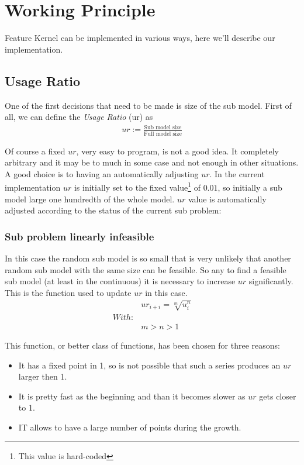 \section{Working Principle}

Feature Kernel can be implemented in various ways, here we'll describe our implementation. 

\subsection{Usage Ratio} \label{sec:usage-ratio}
One of the first decisions that need to be made is size of the sub model.
First of all, we can define the \emph{Usage Ratio} (ur) as 
\begin{align}
    ur := \frac{\text{Sub model size}}{\text{Full model size}} \label{eq:usage-ratio}
\end{align}

Of course a fixed $ur$, very easy to program, is not a good idea. 
It completely arbitrary and it may be to much in some case and not enough in other situations. 
A good choice is to having an automatically adjusting $ur$. In the current implementation $ur$ is initially set to the fixed value\footnote{This value is hard-coded} of $0.01$, so initially
a sub model large one hundredth of the whole model. $ur$ value is automatically adjusted according to the status of the current sub problem:


\subsubsection*{Sub problem linearly infeasible} 

    In this case the random sub model is so small that is very unlikely that another random sub model
    with the same size can be feasible. So any to find a feasible sub model (at least in the continuous) 
    it is necessary to increase $ur$ significantly. This is the function used to update $ur$ in this case. 
    \begin{align}
        &ur_{i+i} = \sqrt[m]{u_{i}^{n}}\label{eq:ur-infease-grow} \\
        With:&\nonumber \\
        &m > n > 1 \nonumber
    \end{align}

    This function, or better class of functions, has been chosen for three reasons:
    \begin{itemize}
        \item It has a fixed point in 1, so is not possible that such a series produces an $ur$ larger then 1.
        \item It is pretty fast as the beginning and than it becomes slower as $ur$ gets closer to 1.
        \item IT allows to have a large number of points during the growth.
    \end{itemize}


